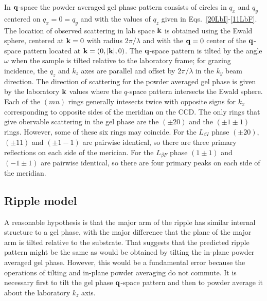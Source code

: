 In $\bold{q}$-space the powder averaged gel phase pattern consists of circles 
in $q_x$ and $q_y$ centered on $q_x=0=q_y$ and with the values of $q_z$ given 
in Eqs.~\ref{20LbI}-\ref{11LbF}.  
The location of observed scattering in lab space $\bold{k}$ is obtained using 
the Ewald sphere, centered at $\bold{k}=0$ with radius $2\pi/\lambda$ and with 
the $\bold{q}=0$ center of the $\bold{q}$-space pattern located 
at $\bold{k}=(0,|\bold{k}|,0)$.  The $\bold{q}$-space pattern is tilted by the 
angle $\omega$ when the sample is tilted relative to the laboratory frame; for 
grazing incidence, the $q_z$ and $k_z$ axes are parallel and offset 
by $2\pi/\lambda$ in the $k_y$ beam direction.  The direction of scattering for 
the powder averaged gel phase is given by the laboratory $\bold{k}$ values 
where the $q$-space pattern intersects the Ewald sphere.  Each of the $(mn)$ 
rings generally intesects twice with opposite signs for $k_x$ corresponding to 
opposite sides of the meridian on the CCD.  The only rings that give obervable 
scattering in the gel phase are the $(\pm20)$ and the $(\pm1\pm1)$ rings.  
However, some of these six rings may coincide. For the $L_{{\beta}I}$ phase 
$(\pm20)$, $(\pm11)$ and $(\pm1-1)$ are pairwise identical, so there are three 
primary reflections on each side of the merician. For the $L_{{\beta}F}$ phase 
$(1\pm1)$ and $(-1\pm1)$ are pairwise identical, so there are four primary peaks 
on each side of the meridian.

\subsection{Ripple model}\label{sec:ripple_model}
A reasonable hypothesis is that the major arm of the ripple has similar 
internal structure to a gel phase, with the major   difference that the plane 
of the major arm is tilted relative to the substrate.  That suggests that the 
predicted ripple pattern might be the same as would be obtained by tilting the 
in-plane powder averaged gel phase.  However, this would be a fundamental error 
because the operations of tilting and in-plane powder averaging do not commute.  
It is necessary first to tilt the gel phase $\bold{q}$-space pattern and then to 
powder average it about the laboratory $k_z$ axis.  

